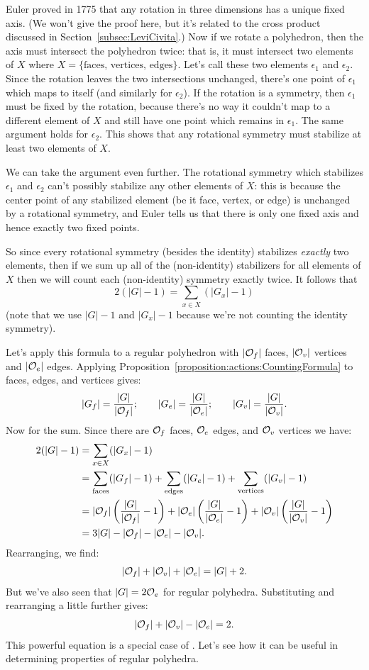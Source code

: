 Euler proved in 1775 that any rotation in three dimensions has a unique fixed axis. (We won't give the proof here, but it's related to the cross product discussed in Section~\ref{subsec:LeviCivita}.)  Now if we  rotate a polyhedron, then the axis must intersect the polyhedron twice: that is, it must intersect two elements of $X$ where $X = \{\text{faces, vertices, edges}\}$. Let's call these two elements $\epsilon_1$ and $\epsilon_2$. Since the rotation leaves the two intersections unchanged, there's one point of $\epsilon_1$ which maps to itself (and similarly for $\epsilon_2$). If the rotation is a symmetry, then $\epsilon_1$ must be fixed by the rotation, because there's no way it couldn't map to a different element of $X$ and still have one point which remains in $\epsilon_1$. The same argument holds for $\epsilon_2$. This shows that any rotational symmetry must stabilize at least two elements of $X$. 

We can take the argument even further. The rotational symmetry which stabilizes $\epsilon_1$ and $\epsilon_2$ can't possibly stabilize any other elements of $X$: this is because the center point of any stabilized element (be it face, vertex, or edge) is unchanged by a rotational symmetry, and Euler tells us that there is only one fixed axis and hence exactly two fixed points.  

So since every rotational symmetry (besides the identity) stabilizes \emph{exactly} two elements, then if we sum up all of the (non-identity) stabilizers for all elements of $X$ then we will count each (non-identity) symmetry exactly twice. It follows that
\[ 2(|G|-1) = \sum_{x \in X}  (|G_x|-1) \]
(note that we use $|G|-1$ and $|G_x|-1$  because we're not counting the identity symmetry). 


Let's apply this formula to a regular polyhedron with $|{\cal O}_f|$ faces, $|{\cal O}_v|$ vertices and $|{\cal O}_e|$ edges.  Applying Proposition~\ref{proposition:actions:CountingFormula} to faces, edges, and vertices gives:
\[ |G_f|=\frac{|G|}{|{\cal O}_f|}; \qquad |G_e|=\frac{|G|}{|{\cal O}_e|}; \qquad |G_v|=\frac{|G|}{|{\cal O}_v|}.\]
Now for the sum.  Since there are ${\cal O}_f$ faces, ${\cal O}_e$ edges, and ${\cal O}_v$ vertices we have:
\begin{align*}
2 (|G| -1) &=  \sum_{x \in X}  (|G_x|-1)\\
&=  \sum_{\text{faces}}  (|G_f|-1)+\sum_{\text{edges}}  (|G_e|-1)+\sum_{\text{vertices}}  (|G_v|-1)\\
&= |{\cal O}_f|  \left(\frac{|G|}{|{\cal O}_f|}-1\right)+ |{\cal O}_e| \left(\frac{|G|}{|{\cal O}_e|}-1\right)+  |{\cal O}_v|\left(\frac{|G|}{|{\cal O}_v|}-1\right)\\
&=  3|G| - |{\cal O}_f| -  |{\cal O}_e| -  |{\cal O}_v|.
\end{align*}
Rearranging, we find:
\[ |{\cal O}_f| +  |{\cal O}_v|  +  |{\cal O}_e| =  |G|+2. \]
But we've also seen that $|G| = 2{\cal O}_e$ for regular polyhedra. Substituting and rearranging a little further gives:
\[ |{\cal O}_f|+|{\cal O}_v|-|{\cal O}_e|=2. \]
This powerful equation is a special case of .  Let's see how it can be useful in determining properties of regular polyhedra.

